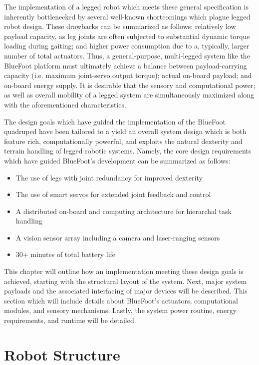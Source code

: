 	The implementation of a legged robot which meets these general specification is inherently bottlenecked by several well-known shortcomings which plague legged robot design. These drawbacks can be summarized as follows: relatively low payload capacity, as leg joints are often subjected to substantial dynamic torque loading during gaiting; and higher power consumption due to a, typically, larger number of total actuators. Thus, a general-purpose, multi-legged system like the BlueFoot platform must ultimately achieve a balance between payload-carrying capacity (i.e. maximum joint-servo output torque); actual on-board payload; and on-board energy supply. It is desirable that the sensory and computational power; as well as overall mobility of a legged system are simultaneously maximized along with the aforementioned characteristics. 
	
	The design goals which have guided the implementation of the BlueFoot quadruped have been tailored to a yield an overall system design which is both feature rich, computationally powerful, and exploits the natural dexterity and terrain handling of legged robotic systems. Namely, the core design requirements which have guided BlueFoot's development can be summarized as follows:
		\begin{itemize}
			\item{The use of legs with joint redundancy for improved dexterity}
			\item{The use of smart servos for extended joint feedback and control}
			\item{A distributed on-board and computing architecture for hierarchal task handling}
			\item{A vision sensor array including a camera and laser-ranging sensors}
			\item{30+ minutes of total battery life}
		\end{itemize}
	
	This chapter will outline how an implementation meeting these design goals is achieved, starting with the structural layout of the system. Next, major system payloads and the associated interfacing of major devices will be described. This section which will include details about BlueFoot's actuators, computational modules, and sensory mechanisms. Lastly, the system power routine, energy requirements, and runtime will be detailed.


	\section{Robot Structure}
	
